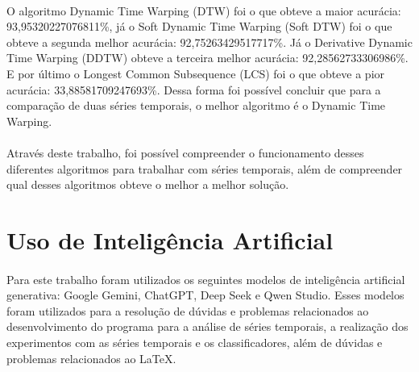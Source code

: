 \documentclass[12pt]{article}
\begin{document}
\paragraph{}O algoritmo Dynamic Time Warping (DTW) foi o que obteve a maior acurácia: 93,95320227076811\%, já o Soft Dynamic Time Warping (Soft DTW) foi o que obteve a segunda melhor acurácia: 92,75263429517717\%. Já o Derivative Dynamic Time Warping (DDTW) obteve a terceira melhor acurácia: 92,28562733306986\%. E por último o Longest Common Subsequence (LCS) foi o que obteve a pior acurácia: 33,88581709247693\%. Dessa forma foi possível concluir que para a comparação de duas séries temporais, o melhor algoritmo é o Dynamic Time Warping.

\paragraph{}Através deste trabalho, foi possível compreender o funcionamento desses diferentes algoritmos para trabalhar com séries temporais, além de compreender qual desses algoritmos obteve o melhor a melhor solução.







\section{Uso de Inteligência Artificial}

\paragraph{}Para este trabalho foram utilizados os seguintes modelos de inteligência artificial generativa: Google Gemini, ChatGPT, Deep Seek e Qwen Studio. Esses modelos foram utilizados para a resolução de dúvidas e problemas relacionados ao desenvolvimento do programa para a análise de séries temporais, a realização dos experimentos com as séries temporais e os classificadores, além de dúvidas e problemas relacionados ao LaTeX.
\end{document}
